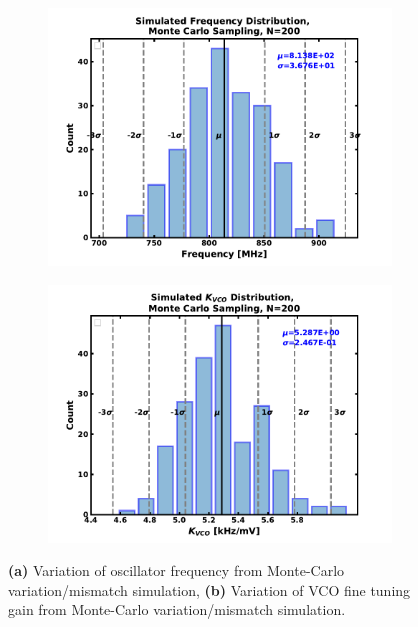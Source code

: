 	\begin{figure}[htb!]
	    \centering
	    \begin{subfigure}{0.5\textwidth}
	        \centering
	        \includegraphics[width=1\textwidth, angle=0]{./figs/results/freq_hist_final}
	        \caption{ }
	        \label{fig:freq_variation}
	    \end{subfigure}%
	    \begin{subfigure}{0.5\textwidth}
	        \centering
	        \includegraphics[width=1\textwidth, angle=0]{./figs/results/kvco_hist_final}
	        \caption{ }
	        \label{fig:kvco_variation}
	    \end{subfigure}
	    \caption{\textbf{(a)} Variation of oscillator frequency from Monte-Carlo variation/mismatch simulation, \textbf{(b)} Variation of VCO fine tuning gain from Monte-Carlo variation/mismatch simulation.}
	    \label{fig:mc_sim_results}
	\end{figure} 
